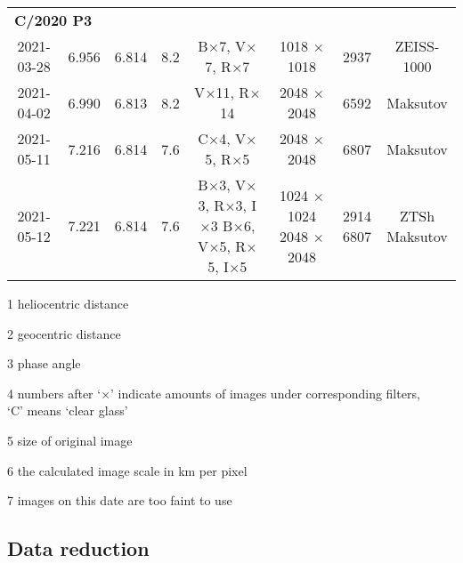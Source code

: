\begin{table}
\begin{threeparttable}
{\begin{tabular}{cccccccc}
            \multicolumn{8}{l}{\textbf{C/2020 P3}} \\
            2021-03-28\tnote{7} & 6.956 & 6.814 & 8.2 & B$\times$7, V$\times$7, R$\times$7 & 1018 $\times$ 1018 & 2937 & ZEISS-1000 \\
            2021-04-02 & 6.990 & 6.813 & 8.2 & V$\times$11, R$\times$14 & 2048 $\times$ 2048 & 6592 & Maksutov \\
            2021-05-11 & 7.216 & 6.814 & 7.6 & C$\times$4, V$\times$5, R$\times$5 & 2048 $\times$ 2048 & 6807 & Maksutov \\
            2021-05-12 & 7.221 & 6.814 & 7.6 & \makecell[c]{B$\times$3, V$\times$3, R$\times$3, I$\times$3 \\ B$\times$6, V$\times$5, R$\times$5, I$\times$5} & \makecell[c]{1024 $\times$ 1024 \\ 2048 $\times$ 2048}  & \makecell[c]{2914 \\ 6807} & \makecell[c]{ZTSh \\ Maksutov} \\
            \bottomrule
        \end{tabular}
        }
        \begin{tablenotes}
            \item[1] heliocentric distance
            \item[2] geocentric distance
            \item[3] phase angle
            \item[4] numbers after `$\times$' indicate amounts of images under corresponding filters, \\
            `C' means `clear glass'
            \item[5] size of original image
            \item[6] the calculated image scale in \si{\km} per pixel
            \item[7] images on this date are too faint to use
        \end{tablenotes}
    \end{threeparttable}
\end{table}

\subsection{Data reduction}

